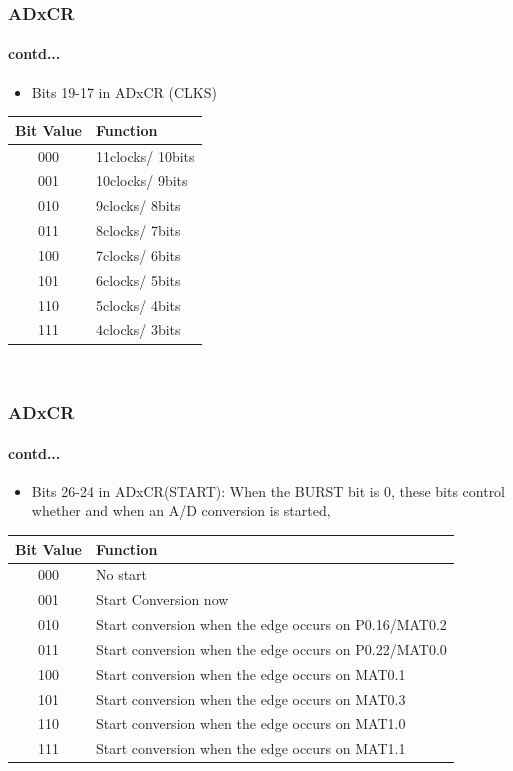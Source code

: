 \documentclass[table,10pt,red]{beamer}
\begin{document}
\begin{frame}
		\frametitle{ADxCR} 
		\framesubtitle{contd...}  \pause
		\begin{itemize}
			\item Bits 19-17 in ADxCR (CLKS)
		\end{itemize}
				\centering
				\begin{tabular}{|c|l|}
					\hline Bit Value & Function \\ 
					\hline 000 & 11clocks/ 10bits \\ 
					\hline 001 & 10clocks/ 9bits \\ 
					\hline 010 & 9clocks/ 8bits \\ 
					\hline 011 & 8clocks/ 7bits \\ 
					\hline 100 & 7clocks/ 6bits \\ 
					\hline 101 & 6clocks/ 5bits \\ 
					\hline 110 & 5clocks/ 4bits \\ 
					\hline 111 & 4clocks/ 3bits \\ 
					\hline 
				\end{tabular} \\[10pt]
				\pause
\end{frame}

\begin{frame}
	\frametitle{ADxCR} 
	\framesubtitle{contd...}  \pause
	\begin{itemize}
		\item Bits 26-24 in ADxCR(START): 	When the BURST bit is 0, these bits control whether and when an A/D conversion is started,
	\end{itemize}
	\centering
	\begin{tabular}{|c|l|}
		\hline Bit Value & Function \\ 
		\hline 000 & No start \\ 
		\hline 001 & Start Conversion now \\ 
		\hline 010 & Start conversion when the edge occurs on P0.16/MAT0.2 \\ 
		\hline 011 & Start conversion when the edge occurs on P0.22/MAT0.0 \\  
		\hline 100 & Start conversion when the edge occurs on MAT0.1 \\ 
		\hline 101 & Start conversion when the edge occurs on MAT0.3 \\ 
		\hline 110 & Start conversion when the edge occurs on MAT1.0 \\ 
		\hline 111 & Start conversion when the edge occurs on MAT1.1 \\ 
		\hline 
	\end{tabular} \\[10pt]
	\pause
\end{frame}
\end{document}
